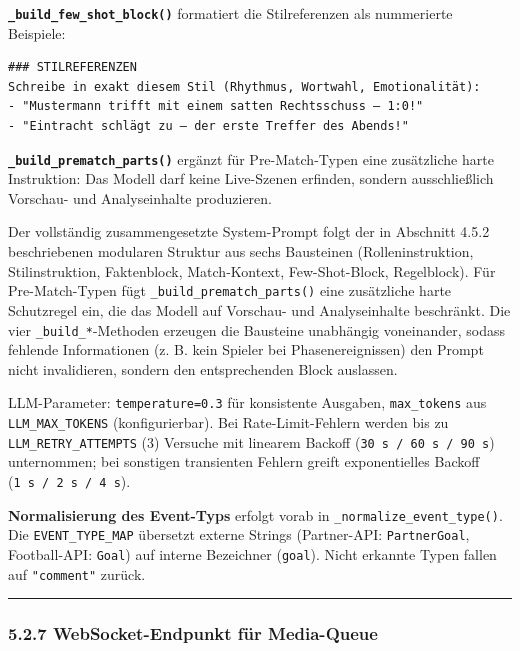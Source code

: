\textbf{\texttt{\_build\_few\_shot\_block()}} formatiert die
Stilreferenzen als nummerierte Beispiele:

\begin{verbatim}
### STILREFERENZEN
Schreibe in exakt diesem Stil (Rhythmus, Wortwahl, Emotionalität):
- "Mustermann trifft mit einem satten Rechtsschuss – 1:0!"
- "Eintracht schlägt zu – der erste Treffer des Abends!"
\end{verbatim}

\textbf{\texttt{\_build\_prematch\_parts()}} ergänzt für Pre-Match-Typen
eine zusätzliche harte Instruktion: Das Modell darf keine Live-Szenen
erfinden, sondern ausschließlich Vorschau- und Analyseinhalte
produzieren.

Der vollständig zusammengesetzte System-Prompt folgt der in Abschnitt
4.5.2 beschriebenen modularen Struktur aus sechs Bausteinen
(Rolleninstruktion, Stilinstruktion, Faktenblock, Match-Kontext,
Few-Shot-Block, Regelblock). Für Pre-Match-Typen fügt
\texttt{\_build\_prematch\_parts()} eine zusätzliche harte Schutzregel
ein, die das Modell auf Vorschau- und Analyseinhalte beschränkt. Die
vier \texttt{\_build\_*}-Methoden erzeugen die Bausteine unabhängig
voneinander, sodass fehlende Informationen (z. B. kein Spieler bei
Phasenereignissen) den Prompt nicht invalidieren, sondern den
entsprechenden Block auslassen.

LLM-Parameter: \texttt{temperature=0.3} für konsistente Ausgaben,
\texttt{max\_tokens} aus \texttt{LLM\_MAX\_TOKENS} (konfigurierbar). Bei
Rate-Limit-Fehlern werden bis zu \texttt{LLM\_RETRY\_ATTEMPTS} (3)
Versuche mit linearem Backoff (\texttt{30\ s\ /\ 60\ s\ /\ 90\ s})
unternommen; bei sonstigen transienten Fehlern greift exponentielles
Backoff (\texttt{1\ s\ /\ 2\ s\ /\ 4\ s}).

\textbf{Normalisierung des Event-Typs} erfolgt vorab in
\texttt{\_normalize\_event\_type()}. Die \texttt{EVENT\_TYPE\_MAP}
übersetzt externe Strings (Partner-API: \texttt{PartnerGoal},
Football-API: \texttt{Goal}) auf interne Bezeichner (\texttt{goal}).
Nicht erkannte Typen fallen auf \texttt{"comment"} zurück.

\begin{center}\rule{0.5\linewidth}{0.5pt}\end{center}

\subsubsection{5.2.7 WebSocket-Endpunkt für
Media-Queue}\label{websocket-endpunkt-fuxfcr-media-queue}

